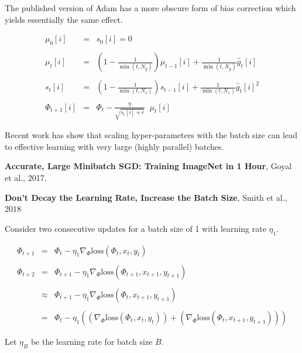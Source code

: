 {\vfill
The published version of Adam has a more obscure form of bias correction which yields essentially the same effect.


\begin{eqnarray*}
  \mu_0[i] & = & s_0[i] = 0 \\
  \\
  \mu_{t}[i] & = & \left(1-\frac{1}{\min(t,N_g)}\right)\mu_{t-1}[i] + \frac{1}{\min(t,N_g)} \hat{g}_t[i] \\
  \\
  s_{t}[i] & = & \left(1-\frac{1}{\min(t,N_s)}\right)s_{t-1}[i] + \frac{1}{\min(t,N_s)} \hat{g}_t[i]^2 \\
  \\
\Phi_{t+1}[i] & =  & \Phi_t - \frac{\eta}{\sqrt{s_{t}[i] + \epsilon}}\;\;\mu_{t}[i]
\end{eqnarray*}


Recent work has show that scaling hyper-parameters with the batch size can lead to effective learning with very large (highly parallel)
batches.

\vfill
{\bf Accurate, Large Minibatch SGD: Training ImageNet in 1 Hour}, Goyal et al., 2017.

\vfill
{\bf Don't Decay the Learning Rate, Increase the Batch Size}, Smith et al., 2018


Consider two consecutive updates for a batch size of 1 with learning rate $\eta_1$.

\begin{eqnarray*}
  \Phi_{t+1} & = & \Phi_t - \eta_1 \nabla_\Phi \mathrm{loss}(\Phi_t,x_t,y_t) \\
  \\
  \Phi_{t+2} & = & \Phi_{t+1} - \eta_1 \nabla_\Phi \mathrm{loss}(\Phi_{t+1},x_{t+1},y_{t+1}) \\\
  \\
  & \approx & \Phi_{t+1} - \eta_1 \nabla_\Phi \mathrm{loss}(\Phi_t,x_{t+1},y_{t+1}) \\
  \\
  & = & \Phi_t - \eta_1((\nabla_\Phi \mathrm{loss}(\Phi_t,x_t,y_t)) + (\nabla_\Phi \mathrm{loss}(\Phi_t,x_{t+1},y_{t+1})))
\end{eqnarray*}


Let $\eta_B$ be the learning rate for batch size $B$.

}
